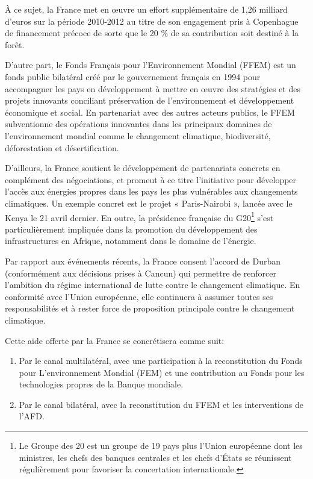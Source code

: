 \documentclass[a4paper,11pt]{article}
\begin{document}
À ce sujet, la France met en œuvre un effort supplémentaire de 1,26 milliard d’euros sur la période 2010-2012 au titre de son engagement pris à Copenhague de financement précoce de sorte que le 20 \% de sa contribution soit destiné à la forêt.

D’autre part, le Fonds Français pour l'Environnement Mondial (FFEM) est un fonds public bilatéral créé par le gouvernement français en 1994 pour accompagner les pays en développement à mettre en œuvre des stratégies et des projets innovants conciliant préservation de l’environnement et développement économique et social. En partenariat avec des autres acteurs publics, le FFEM subventionne des opérations innovantes dans les principaux domaines de l’environnement mondial comme le changement climatique, biodiversité, déforestation et désertification.

D’ailleurs, la France soutient le développement de partenariats concrets en complément des négociations, et promeut à ce titre l’initiative pour développer l'accès aux énergies propres dans les pays les plus vulnérables aux changements climatiques. Un exemple concret est le projet « Paris-Nairobi », lancée avec le Kenya le 21 avril dernier. En outre, la présidence française du G20\footnote{Le Groupe des 20 est un groupe de 19 pays plus l'Union européenne dont les ministres, les chefs des banques centrales et les chefs d'États se réunissent régulièrement pour favoriser la concertation internationale.} s’est particulièrement impliquée dans la promotion du développement des infrastructures en Afrique, notamment dans le domaine de l’énergie. 

Par rapport aux événements récents, la France consent l'accord de Durban (conformément aux décisions prises à Cancun) qui permettre de renforcer l’ambition du régime international de lutte contre le changement climatique. En conformité avec l’Union européenne, elle continuera à assumer toutes ses responsabilités et à rester force de proposition principale contre le changement climatique. 

Cette aide offerte par la France se concrétisera comme suit:
\begin{enumerate}
\item Par le canal multilatéral, avec une participation à la reconstitution du Fonds pour L'environnement Mondial (FEM) et une contribution au Fonds pour les technologies propres de la Banque mondiale.
\item Par le canal bilatéral, avec la reconstitution du FFEM et les interventions de l’AFD.
\end{enumerate}
\end{document}
